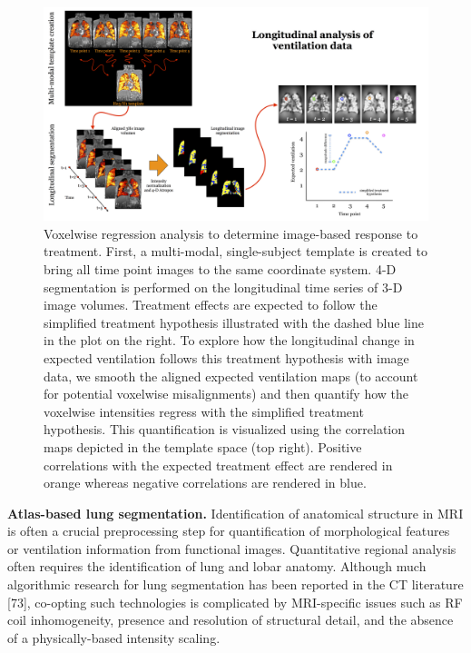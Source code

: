 \documentclass[11pt,]{article}
\begin{document}
\begin{figure}[htbp]
\centering
\includegraphics{Figs/longitudinalStudy.png}
\caption{Voxelwise regression analysis to determine image-based response
to treatment. First, a multi-modal, single-subject template is created
to bring all time point images to the same coordinate system. 4-D
segmentation is performed on the longitudinal time series of 3-D image
volumes. Treatment effects are expected to follow the simplified
treatment hypothesis illustrated with the dashed blue line in the plot
on the right. To explore how the longitudinal change in expected
ventilation follows this treatment hypothesis with image data, we smooth
the aligned expected ventilation maps (to account for potential
voxelwise misalignments) and then quantify how the voxelwise intensities
regress with the simplified treatment hypothesis. This quantification is
visualized using the correlation maps depicted in the template space
(top right). Positive correlations with the expected treatment effect
are rendered in orange whereas negative correlations are rendered in
blue.}
\end{figure}

\textbf{Atlas-based lung segmentation.} Identification of anatomical
structure in MRI is often a crucial preprocessing step for
quantification of morphological features or ventilation information from
functional images. Quantitative regional analysis often requires the
identification of lung and lobar anatomy. Although much algorithmic
research for lung segmentation has been reported in the CT literature
{[}73{]}, co-opting such technologies is complicated by MRI-specific
issues such as RF coil inhomogeneity, presence and resolution of
structural detail, and the absence of a physically-based intensity
scaling.
\end{document}
